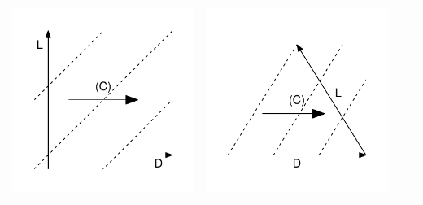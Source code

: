 \documentclass[11pt,oneside,a4paper]{article} %
\begin{document}
\begin{center}
\begin{longtable}{m{}m{}m{}m{}}
  \includegraphics[width = \linewidth]{Figures/JonasTable/LDc.pdf} & \includegraphics[width = \linewidth]{Figures/JonasTable/LDc_iso.pdf}  \\

\end{longtable}
\end{center}
\end{document}
